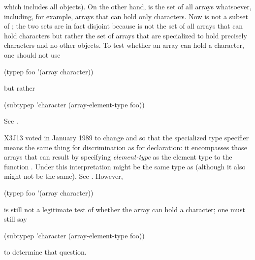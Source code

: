 \begin{flushdesc}
which includes all objects).  On the other hand, 
is the set of all arrays whatsoever, including, for example,
arrays that can hold only characters.  Now
 is not a subset of ; the two sets
are in fact disjoint because  is not the
set of all arrays that can hold characters but rather the set of
arrays that are specialized to hold precisely characters and no
other objects.  To test whether an array  can hold a character,
one should not use
\begin{lisp}
(typep foo '(array character))
\end{lisp}
but rather
\begin{lisp}
(subtypep 'character (array-element-type foo))
\end{lisp}
See .
\begin{new}
X3J13 voted in January 1989
to change  and 
so that the specialized  type specifier
means the same thing for discrimination
as for declaration: it encompasses those arrays
that can result by specifying \textit{element-type} as the element type
to the function .
Under this interpretation  might be
the same type as 
(although it also might not be the same).
See .
However,
\begin{lisp}
(typep foo '(array character))
\end{lisp}
is still not a legitimate test of whether the array
 can hold a character; one must still say
\begin{lisp}
(subtypep 'character (array-element-type foo))
\end{lisp}
to determine that question.


\end{new}
\end{flushdesc}
